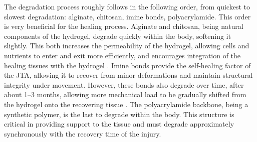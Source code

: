 The degradation process roughly follows in the following order, from quickest to slowest degradation: alginate, chitosan, imine bonds, polyacrylamide. This order is very beneficial for the healing process. Alginate and chitosan, being natural components of the hydrogel, degrade quickly within the body, softening it slightly.
This both increases the permeability of the hydrogel, allowing cells and nutrients to enter and exit more efficiently, and encourages integration of the healing tissues with the hydrogel \autocite{RN4}.
Imine bonds provide the self-healing factor of the JTA, allowing it to recover from minor deformations and maintain structural integrity under movement. However, these bonds also degrade over time, after about 1--3 months, allowing more mechanical load to be gradually shifted from the hydrogel onto the recovering tissue \autocite{xuHydrogelsBasedSchiff2019}.
The polyacrylamide backbone, being a synthetic polymer, is the last to degrade within the body. This structure is critical in providing support to the tissue and must degrade approximately synchronously with the recovery time of the injury.